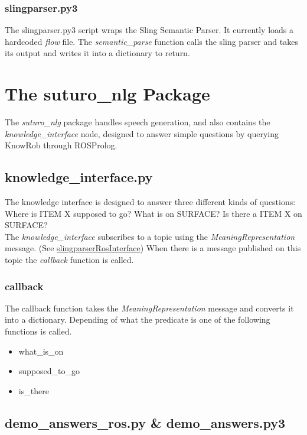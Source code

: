 \documentclass[main.tex]{subfiles}
\begin{document}
        \subsubsection{slingparser.py3}
            The slingparser.py3 script wraps the Sling Semantic Parser. It currently loads a hardcoded \textit{flow} file.
            The \textit{semantic\_parse} function calls the sling parser and takes its output and writes it into a dictionary to return.
    
\section{The suturo\_nlg Package}
    The \textit{suturo\_nlg} package handles speech generation, and also contains the \textit{knowledge\_interface} node, designed to answer simple questions by querying KnowRob through ROSProlog.
    \subsection{knowledge\_interface.py}
        The knowledge interface is designed to answer three different kinds of questions: Where is ITEM X supposed to go? What is on SURFACE? Is there a ITEM X on SURFACE?\\
        The \textit{knowledge\_interface} subscribes to a topic using the \textit{MeaningRepresentation} message. (See \hyperref[slingparserros]{slingparserRosInterface}) When there is a message published on this topic the \textit{callback} function is called.
        \subsubsection{callback}
            The callback function takes the \textit{MeaningRepresentation} message and converts it into a dictionary.
            Depending of what the predicate is one of the following functions is called.
            \begin{itemize}
                \item what\_is\_on
                \item supposed\_to\_go
                \item is\_there             
            \end{itemize}
    \subsection{demo\_answers\_ros.py \& demo\_answers.py3}
    
\end{document}
